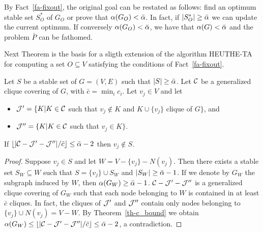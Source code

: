  By Fact~\ref{fa-fixout}, the original goal can be restated as
follows: find an optimum stable set $S^*_O$ of $G_O$ or prove that
$\alpha(G_O)<{\bar \alpha}$. In fact, if $|S^*_O|\geq{\bar \alpha}$ we can update
the current optimum. If conversely $\alpha(G_O)<{\bar \alpha}$, we have
that $\alpha(G)<{\bar \alpha}$ and the problem $\bar P$ can be fathomed.

 Next Theorem is the basis for a sligth extension of the algorithm
HEUTHE-TA for computing a set $O \subseteq V$ satisfying the
conditions of Fact~\ref{fa-fixout}.
\begin{theorem}
Let $S$ be a stable set of $G=(V,E)$ such that $|S| \geq {\bar \alpha}$.
Let $\cal C$ be a generalized clique covering of $G$, with $\bar c =
\min_i c_i$. Let $v_j \in V$ and let
\begin{itemize} 
\item ${\cal J}' = \{K|K \in {\cal C}$ such that $v_j \notin K$ and 
$K \cup \{v_j\}$ clique of $G \}$, and 
\item  ${\cal J}'' = \{K|K \in {\cal C}$ such that $v_j \in K\}$.
\end{itemize}
 If  $\lfloor|{\cal C}-{\cal J}'-{\cal J}''|/\bar
c\rfloor\leq{\bar \alpha}-2$  then $v_j \notin S$. 
\end{theorem}


\begin{proof}
 Suppose $v_j \in S$ and let $W = V - \{v_j\} - N(v_j)$. Then there
exists a stable set $S_W \subseteq W$ such that $S =
\{v_j\} \cup S_W$ and $|S_W|\geq{\bar \alpha}-1$. If we denote by
$G_W$ the subgraph induced by $W$, then $\alpha(G_W)\geq{\bar \alpha}-1$.
${\cal C}-{\cal J'}-{\cal J''}$ is a generalized clique
covering of $G_W$ such that each node belonging to $W$ is contained
in at least $\bar c$ cliques. In fact, the cliques of ${\cal J'}$
and $\cal J''$ contain only nodes belonging to $\{v_j\} \cup
N(v_j) = V - W$. By  Theorem~\ref{th-c_bound} we obtain $\alpha(G_W)
\leq \lfloor|{\cal C}-{\cal J'}-{\cal J''}|/\bar c
\rfloor\leq{\bar \alpha}-2$, a contradiction.
  \end{proof}

